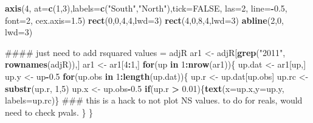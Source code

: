 \documentclass[]{article}
\newenvironment{Shaded}{\begin{snugshade}}{\end{snugshade}}
\newcommand{\KeywordTok}[1]{\textcolor[rgb]{0.13,0.29,0.53}{\textbf{#1}}}
\newcommand{\DataTypeTok}[1]{\textcolor[rgb]{0.13,0.29,0.53}{#1}}
\newcommand{\DecValTok}[1]{\textcolor[rgb]{0.00,0.00,0.81}{#1}}
\newcommand{\FloatTok}[1]{\textcolor[rgb]{0.00,0.00,0.81}{#1}}
\newcommand{\StringTok}[1]{\textcolor[rgb]{0.31,0.60,0.02}{#1}}
\newcommand{\OtherTok}[1]{\textcolor[rgb]{0.56,0.35,0.01}{#1}}
\newcommand{\ControlFlowTok}[1]{\textcolor[rgb]{0.13,0.29,0.53}{\textbf{#1}}}
\newcommand{\OperatorTok}[1]{\textcolor[rgb]{0.81,0.36,0.00}{\textbf{#1}}}
\newcommand{\NormalTok}[1]{#1}
\begin{document}
\begin{Shaded}
\begin{Highlighting}[]
\KeywordTok{axis}\NormalTok{(}\DecValTok{4}\NormalTok{, }\DataTypeTok{at=}\KeywordTok{c}\NormalTok{(}\DecValTok{1}\NormalTok{,}\DecValTok{3}\NormalTok{),}\DataTypeTok{labels=}\KeywordTok{c}\NormalTok{(}\StringTok{"South"}\NormalTok{,}\StringTok{"North"}\NormalTok{),}\DataTypeTok{tick=}\OtherTok{FALSE}\NormalTok{, }\DataTypeTok{las=}\DecValTok{2}\NormalTok{, }\DataTypeTok{line=}\OperatorTok{-}\FloatTok{0.5}\NormalTok{, }\DataTypeTok{font=}\DecValTok{2}\NormalTok{, }\DataTypeTok{cex.axis=}\FloatTok{1.5}\NormalTok{)}
\KeywordTok{rect}\NormalTok{(}\DecValTok{0}\NormalTok{,}\DecValTok{0}\NormalTok{,}\DecValTok{4}\NormalTok{,}\DecValTok{4}\NormalTok{,}\DataTypeTok{lwd=}\DecValTok{3}\NormalTok{)}
\KeywordTok{rect}\NormalTok{(}\DecValTok{4}\NormalTok{,}\DecValTok{0}\NormalTok{,}\DecValTok{8}\NormalTok{,}\DecValTok{4}\NormalTok{,}\DataTypeTok{lwd=}\DecValTok{3}\NormalTok{)}
\KeywordTok{abline}\NormalTok{(}\DecValTok{2}\NormalTok{,}\DecValTok{0}\NormalTok{, }\DataTypeTok{lwd=}\DecValTok{3}\NormalTok{)}


\NormalTok{#### just need to add rsquared values = adjR}
\NormalTok{ar1 <-}\StringTok{ }\NormalTok{adjR[}\KeywordTok{grep}\NormalTok{(}\StringTok{"2011"}\NormalTok{, }\KeywordTok{rownames}\NormalTok{(adjR)),]}
\NormalTok{ar1 <-}\StringTok{ }\NormalTok{ar1[}\DecValTok{4}\OperatorTok{:}\DecValTok{1}\NormalTok{,]}
\ControlFlowTok{for}\NormalTok{(up }\ControlFlowTok{in} \DecValTok{1}\OperatorTok{:}\KeywordTok{nrow}\NormalTok{(ar1))\{}
\NormalTok{  up.dat <-}\StringTok{ }\NormalTok{ar1[up,]}
\NormalTok{  up.y <-}\StringTok{ }\NormalTok{up}\OperatorTok{-}\FloatTok{0.5}
  \ControlFlowTok{for}\NormalTok{(up.obs }\ControlFlowTok{in} \DecValTok{1}\OperatorTok{:}\KeywordTok{length}\NormalTok{(up.dat))\{}
\NormalTok{    up.r <-}\StringTok{ }\NormalTok{up.dat[up.obs]}
\NormalTok{    up.rc <-}\StringTok{ }\KeywordTok{substr}\NormalTok{(up.r, }\DecValTok{1}\NormalTok{,}\DecValTok{5}\NormalTok{)}
\NormalTok{    up.x <-}\StringTok{ }\NormalTok{up.obs}\OperatorTok{-}\FloatTok{0.5}
    \ControlFlowTok{if}\NormalTok{(up.r }\OperatorTok{>}\StringTok{ }\FloatTok{0.01}\NormalTok{)\{}\KeywordTok{text}\NormalTok{(}\DataTypeTok{x=}\NormalTok{up.x,}\DataTypeTok{y=}\NormalTok{up.y, }\DataTypeTok{labels=}\NormalTok{up.rc)\}  ### this is a hack to not plot NS values.  to do for reals, would need to check pvals.}
\NormalTok{  \}}
\NormalTok{\}}


\end{Highlighting}
\end{Shaded}
\end{document}
